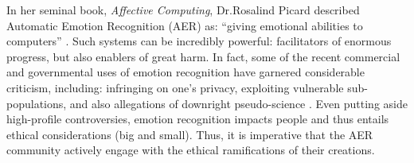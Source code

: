 \documentclass{clv3}
\begin{document}
In her seminal book, \textit{Affective Computing}, Dr.\@ Rosalind Picard described Automatic Emotion Recognition (AER) as: ``giving emotional abilities to computers” \cite{picard2000affective}.  
Such systems can be incredibly powerful:  facilitators of enormous progress, but also enablers of great harm. 
In fact, some of the recent commercial and governmental uses of emotion recognition have garnered considerable criticism, including:
infringing on one's privacy, exploiting vulnerable sub-populations, and %
also allegations of downright pseudo-science \cite{wakefield_2021,article19_2021,woensel_nevil_2019}.
Even putting aside high-profile controversies, emotion recognition impacts people and thus entails ethical considerations (big and small). 
Thus, it is imperative that the AER community actively engage with the ethical ramifications of their creations. 
\end{document}
